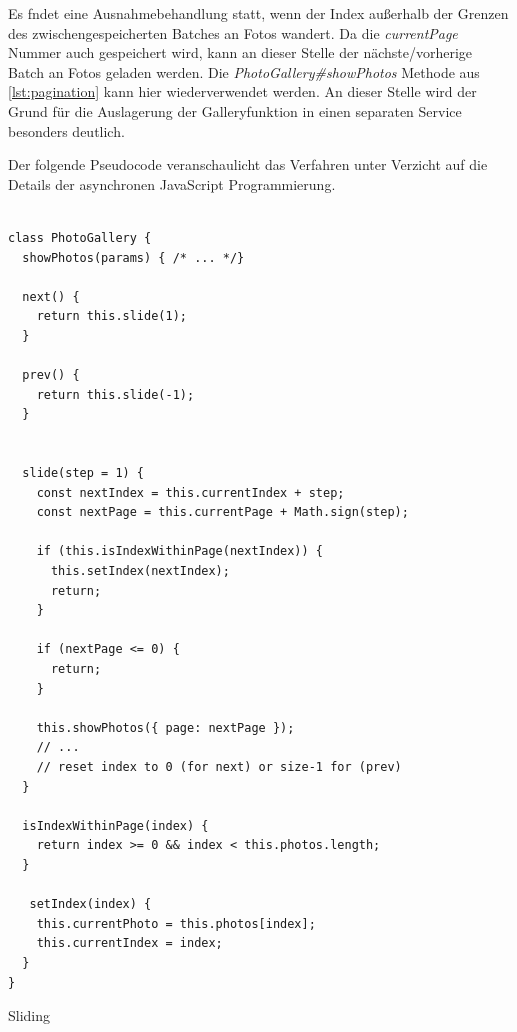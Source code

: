 Es fndet eine Ausnahmebehandlung statt, wenn der Index außerhalb der Grenzen des zwischengespeicherten Batches an Fotos wandert. Da die \textit{currentPage} Nummer auch gespeichert wird, kann an dieser Stelle der nächste/vorherige Batch an Fotos geladen werden. Die \textit{PhotoGallery\#showPhotos} Methode aus \ref{lst:pagination} kann hier wiederverwendet werden. An dieser Stelle wird der Grund für die Auslagerung der Galleryfunktion in einen separaten Service besonders deutlich.

Der folgende Pseudocode veranschaulicht das Verfahren unter Verzicht auf die Details der asynchronen JavaScript Programmierung.

\begin{listing}[H]
\begin{verbatim}

class PhotoGallery {
  showPhotos(params) { /* ... */}

  next() {
    return this.slide(1);
  }

  prev() {
    return this.slide(-1);
  }


  slide(step = 1) {
    const nextIndex = this.currentIndex + step;
    const nextPage = this.currentPage + Math.sign(step);

    if (this.isIndexWithinPage(nextIndex)) {
      this.setIndex(nextIndex);
      return;
    }

    if (nextPage <= 0) {
      return;
    }

    this.showPhotos({ page: nextPage });
    // ...
    // reset index to 0 (for next) or size-1 for (prev)
  }

  isIndexWithinPage(index) {
    return index >= 0 && index < this.photos.length;
  }

   setIndex(index) {
    this.currentPhoto = this.photos[index];
    this.currentIndex = index;
  }
}

\end{verbatim}
\caption{Sliding}
\label{lst:sliding}
\end{listing}
